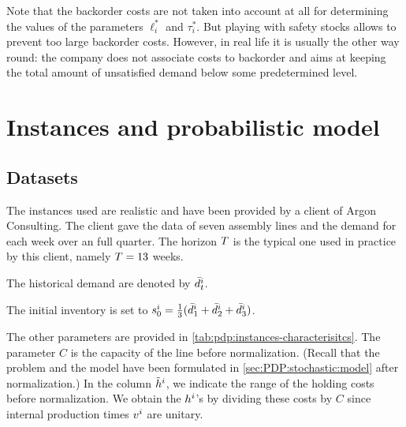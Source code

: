 Note that the backorder costs are not taken into account at all for determining the values of the parameters $\ell_i^*$ and $\tau_i^*$.
But playing with safety stocks allows to prevent too large backorder costs.
However, in real life it is usually the other way round: the company does not associate costs to backorder and aims at keeping the total amount of unsatisfied demand below some predetermined level.




\section{Instances and probabilistic model}
\label{sec:PDP:numerical-experiments:instances}


\subsection{Datasets}
\label{sec:PDP:numerical-experiments:historical-data}

The instances used are realistic and have been provided by a client of Argon Consulting.
The client gave the data of seven assembly lines and the demand for each week over an full quarter.
The horizon $T$ is the typical one used in practice by this client, namely $T=13$ weeks.

The historical demand are denoted by $\bar{d}_t^i$.

The initial inventory is set to $s_0^i=\frac{1}{3}(\bar{d}_1^i+\bar{d}_2^i+\bar{d}_3^i)$.

The other parameters are provided in \cref{tab:pdp:instances-characterisitcs}.
The parameter $C$ is the capacity of the line before normalization.
(Recall that the problem and the model have been formulated in \cref{sec:PDP:stochastic:model} after normalization.)
In the column $\tilde{h}^i$, we indicate the range of the holding costs before normalization.
We obtain the $h^i$'s by dividing these costs by $C$ since internal production times $v^i$ are unitary.

